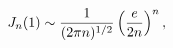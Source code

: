 \[\mathop{J_{n}\/}\nolimits\!\left(1\right)\sim\frac{1}{(2\pi n)^{1/2}}\left(%
\frac{e}{2n}\right)^{n},\]